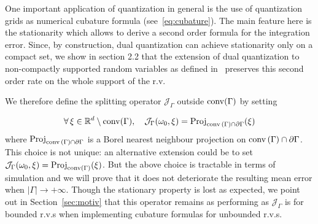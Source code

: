 One important application of quantization in general is the use of quantization grids as numerical cubature formula (see~\eqref{eq:cubature}). 
The main feature here is the stationarity which allows to derive a second order formula for the integration error. 
Since, by construction, dual quantization can  achieve stationarity only on a compact set, we show in section 2.2 that the extension of dual quantization to non-compactly supported random variables as defined in~\cite{dualStat} preserves this second order rate on the whole support of the r.v.

We therefore define the splitting operator $\mathcal{J} _{\Gamma}$ outside $\operatorname{conv}(\Gamma)$ by setting

\[ 
\forall\,\xi \in \mathbb{R}^d\setminus
\operatorname{conv}(\Gamma),\quad \mathcal{J}_{\Gamma}(\omega_0,\xi)= {\rm
Proj}_{\operatorname{conv}{(\Gamma)}\cap \partial\Gamma}(\xi) 
\] 
where $ {\rm Proj}_{\operatorname{conv}{(\Gamma)}\cap \partial\Gamma}$ is a Borel nearest neighbour projection on $\operatorname{conv}{(\Gamma)}\cap \partial\Gamma$. This choice is not unique: an alternative extension could be  to set   $\mathcal{J}_{\Gamma}(\omega_0,\xi)={\rm Proj}_{\operatorname{conv}(\Gamma)}(\xi)$. 
But the above  choice is   tractable in terms of simulation and we will prove that it does not deteriorate  the resulting mean error when $|\Gamma|\to +\infty$. Though the stationary property is lost as expected, we point out  in Section~\ref{sec:motiv} that this operator remains as performing as $\mathcal{J}_{\Gamma}$ is for bounded r.v.s when implementing cubature formulas for unbounded r.v.s. 

%

